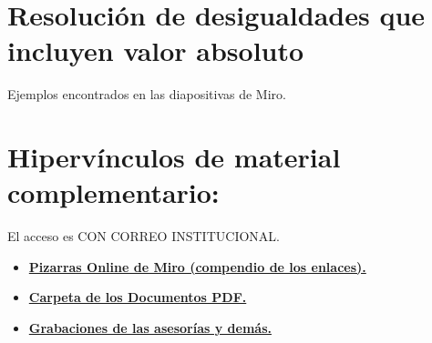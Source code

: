 \documentclass[letterpaper, 12pt]{article}
\begin{document}
        \section{Resolución de desigualdades que incluyen valor absoluto}
        Ejemplos encontrados en las diapositivas de Miro.
        \section*{Hipervínculos de material complementario:}
        El acceso es CON CORREO INSTITUCIONAL.
        \begin{itemize}
            \item \href{https://docs.google.com/document/d/1mhFr7S5rJ7TwR297Kd6l8b6NPvYkUAlpWIxuz4VKV2w/edit?usp=sharing}{\textbf{Pizarras Online de Miro (compendio de los enlaces).}}
            \item \href{https://drive.google.com/drive/folders/1yL1gAIbVpgKB3h8498KFNE7NDZjoxIWa?usp=sharing}{\textbf{Carpeta de los Documentos PDF.}}
            \item \href{https://drive.google.com/drive/folders/1TPtNSe4ErSgaBLw2kgYDQadyXqvh6AYC?usp=sharing}{\textbf{Grabaciones de las asesorías y demás.}}
        \end{itemize}
\end{document}
